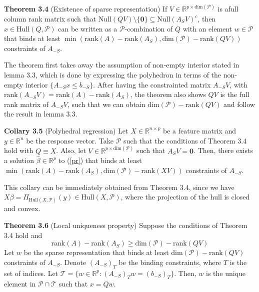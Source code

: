 \documentclass[11pt]{article}
\begin{document}
\newpage
\textbf{Theorem 3.4} (Existence of sparse representation)\quad 
If $V \in \mathbb{R}^{p \times \text{dim}(\mathcal{P})}$ is afull column rank matrix such that 
$\text{Null}(QV)\setminus\{\pmb{0}\}\subseteq\text{Null}(A_SV)^c$, then
$x \in \text{Hull}(Q, \mathcal{P})$ can be written as a $\mathcal{P}$-combination of $Q$ with an 
element $w \in \mathcal{P}$ that binds at least 
$\min(\text{rank}(A) - \text{rank}(A_S), \text{dim}(\mathcal{P}) - \text{rank}(QV))$ constraints 
of $A_{-S}$.

The theorem first takes away the assumption of non-empty interior stated in lemma 3.3, which is 
done by expressing the polyhedron in terms of the non-empty interior $\{A_{-S}x \leq b_{-S}\}$. 
After having the constrainted matrix $A_{-S}V$, with $\text{rank}(A_{-S}V) = \text{rank}(A) - \text{rank}(A_S)$,
the theorem also shows $QV$ is the full rank matrix of $A_{-S}V$, such that we can obtain 
$\text{dim}(\mathcal{P}) - \text{rank}(QV)$ and follow the result in lemma 3.3.

\textbf{Collary 3.5} (Polyhedral regression) \quad 
Let $X \in \mathbb{R}^{n \times p}$ be a feature matrix and $y\in \mathbb{R}^{n}$ be the response 
vector. Take $\mathcal{P}$ such that the conditions of Theorem 3.4 hold with $Q \equiv X$. Also, let 
$V \in \mathbb{R}^{p \times \text{dim}(\mathcal{P})}$ such that $A_SV = \pmb{0}$. Then, there exists 
a solution $\hat{\beta} \in \mathbb{R}^p$ to (\ref{pr}) that binds at least 
$\min(\text{rank}(A) - \text{rank}(A_S), \text{dim}(\mathcal{P}) - \text{rank}(XV))$ 
constraints of $A_{-S}$.

This collary can be immediately obtained from Theorem 3.4, since we have
$X\beta = \Pi_{\text{Hull}(X, \mathcal{P})}(y) \in \text{Hull}(X, \mathcal{P})$, where the 
projection of the hull is closed and convex.

\textbf{Theorem 3.6} (Local uniqueness property)\quad 
Suppose the conditions of Theorem 3.4 hold and
$$
\text{rank}(A) - \text{rank}(A_S) \geq \text{dim}(\mathcal{P}) - \text{rank}(QV)
$$
Let $w$ be the sparse representation that binds at least $\text{dim}(\mathcal{P}) - \text{rank}(QV)$ 
constraints of $A_{-S}$. Denote $(A_{-S})_T$ be the binding constraints, where $T$ is the set of 
indices. Let $\mathcal{T} = \{w \in \mathbb{R}^p : (A_{-S})_Tw = (b_{-S})_T\}$. Then, $w$ is the 
unique element in $\mathcal{P} \cap \mathcal{T}$ such that $x = Qw$.
\end{document}
